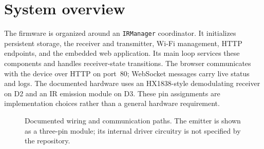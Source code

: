 \documentclass[11pt]{article}
\begin{document}
\section{System overview}
The firmware is organized around an \texttt{IRManager} coordinator. It initializes persistent storage, the receiver and transmitter, Wi-Fi management, HTTP endpoints, and the embedded web application. Its main loop services these components and handles receiver-state transitions. The browser communicates with the device over HTTP on port~80; WebSocket messages carry live status and logs. The documented hardware uses an HX1838-style demodulating receiver on D2 and an IR emission module on D3. These pin assignments are implementation choices rather than a general hardware requirement.

\begin{figure}[ht]
\centering
{}
\caption{Documented wiring and communication paths. The emitter is shown as a three-pin module; its internal driver circuitry is not specified by the repository.}
\label{fig:wiring}
\end{figure}
\end{document}
